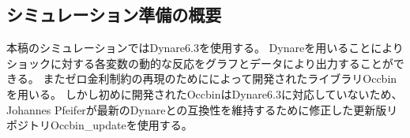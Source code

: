 
\subsection{シミュレーション準備の概要}
\label{sec:chapter4_method_overview}
本稿のシミュレーションではDynare6.3を使用する。
Dynareを用いることによりショックに対する各変数の動的な反応をグラフとデータにより出力することができる。
またゼロ金利制約の再現のために\textcite{GuerrieriIacoviello2015}によって開発されたライブラリOccbinを用いる。
しかし初めに開発されたOccbinはDynare6.3に対応していないため、
Johannes Pfeiferが最新のDynareとの互換性を維持するために修正した更新版リポジトリOccbin\_updateを使用する。